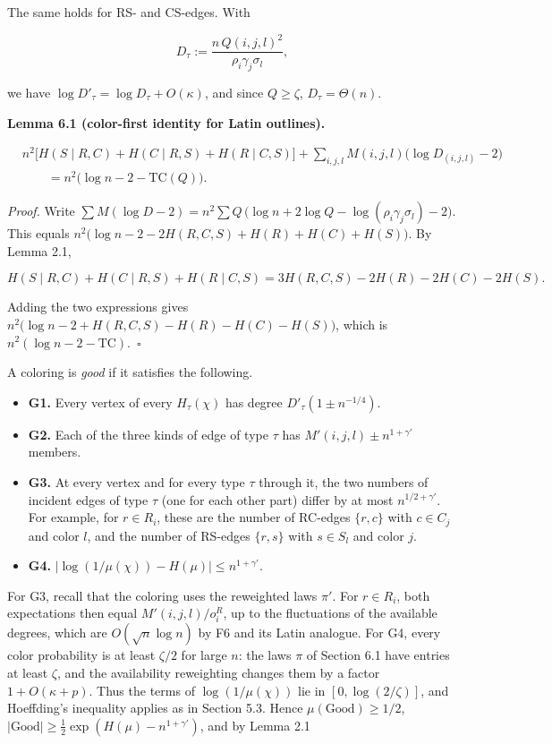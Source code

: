 \documentclass[english,11pt,a4paper]{article}
\providecommand{\tightlist}{\setlength{\itemsep}{0pt}\setlength{\parskip}{0pt}}
\begin{document}
The same holds for RS- and CS-edges. With

\nopagebreak[4]
\[D_\tau:=\frac{n\,Q(i,j,l)^2}{\rho_i\gamma_j\sigma_l},\]

we have \(\log D'_\tau=\log D_\tau+O(\kappa)\), and since \(Q\ge\zeta\), \(D_\tau=\Theta(n)\).

\textbf{Lemma 6.1 (color-first identity for Latin outlines).}

\nopagebreak[4]
\[\begin{aligned}
&n^2\bigl[H(S\mid R,C)+H(C\mid R,S)+H(R\mid C,S)\bigr]+\sum_{i,j,l}M(i,j,l)\bigl(\log D_{(i,j,l)}-2\bigr)\\
&\qquad=n^2\bigl(\log n-2-\mathrm{TC}(Q)\bigr).
\end{aligned}\]

\emph{Proof.} Write \(\sum M(\log D-2)=n^2\sum Q\,\bigl(\log n+2\log Q-\log(\rho_i\gamma_j\sigma_l)-2\bigr)\). This equals \(n^2\bigl(\log n-2-2H(R,C,S)+H(R)+H(C)+H(S)\bigr)\). By Lemma 2.1,

\nopagebreak[4]
\[H(S\mid R,C)+H(C\mid R,S)+H(R\mid C,S)=3H(R,C,S)-2H(R)-2H(C)-2H(S).\]

Adding the two expressions gives \(n^2\bigl(\log n-2+H(R,C,S)-H(R)-H(C)-H(S)\bigr)\), which is \(n^2(\log n-2-\mathrm{TC})\).~\(\square\)

A coloring is \emph{good} if it satisfies the following.

\begin{itemize}
\tightlist
\item
  \textbf{G1.} Every vertex of every \(H_\tau(\chi)\) has degree \(D'_\tau(1\pm n^{-1/4})\).
\item
  \textbf{G2.} Each of the three kinds of edge of type \(\tau\) has \(M'(i,j,l)\pm n^{1+\gamma'}\) members.
\item
  \textbf{G3.} At every vertex and for every type \(\tau\) through it, the two numbers of incident edges of type \(\tau\) (one for each other part) differ by at most \(n^{1/2+\gamma'}\). For example, for \(r\in R_i\), these are the number of RC-edges \(\{r,c\}\) with \(c\in C_j\) and color \(l\), and the number of RS-edges \(\{r,s\}\) with \(s\in S_l\) and color \(j\).
\item
  \textbf{G4.} \(\bigl|\log(1/\mu(\chi))-H(\mu)\bigr|\le n^{1+\gamma'}\).
\end{itemize}

For G3, recall that the coloring uses the reweighted laws \(\pi'\). For \(r\in R_i\), both expectations then equal \(M'(i,j,l)/o^R_i\), up to the fluctuations of the available degrees, which are \(O(\sqrt n\log n)\) by F6 and its Latin analogue. For G4, every color probability is at least \(\zeta/2\) for large \(n\): the laws \(\pi\) of Section 6.1 have entries at least \(\zeta\), and the availability reweighting changes them by a factor \(1+O(\kappa+p)\). Thus the terms of \(\log(1/\mu(\chi))\) lie in \([0,\log(2/\zeta)]\), and Hoeffding's inequality applies as in Section 5.3. Hence \(\mu(\mathrm{Good})\ge1/2\), \(|\mathrm{Good}|\ge\frac12\exp(H(\mu)-n^{1+\gamma'})\), and by Lemma 2.1
\end{document}
